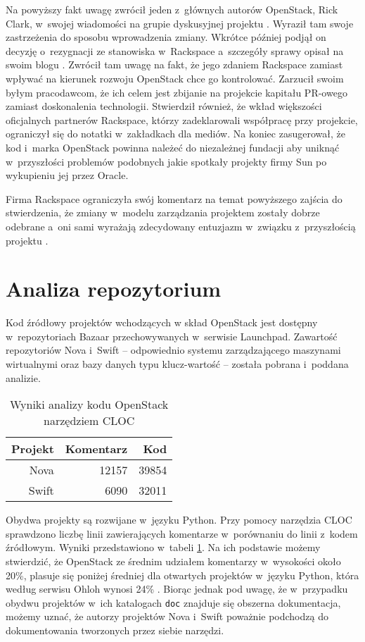 \documentclass[a4paper,12pt]{article}
\begin{document}
	Na powyższy fakt uwagę zwrócił jeden z~głównych autorów OpenStack, Rick
	Clark, w~swojej wiadomości na grupie dyskusyjnej projektu
	\cite{clark_list_msg}. Wyraził tam swoje zastrzeżenia do sposobu
	wprowadzenia zmiany. Wkrótce później podjął on decyzję o~rezygnacji ze
	stanowiska w~Rackspace a~szczegóły sprawy opisał na swoim blogu
	\cite{why_i_left_rackspace}. Zwrócił tam uwagę na fakt, że jego zdaniem
	Rackspace zamiast wpływać na kierunek rozwoju OpenStack chce go kontrolować.
	Zarzucił swoim byłym pracodawcom, że ich celem jest zbijanie na projekcie
	kapitału PR-owego zamiast doskonalenia technologii. Stwierdził również, że
	wkład większości oficjalnych partnerów Rackspace, którzy zadeklarowali
	współpracę przy projekcie, ograniczył się do notatki w~zakładkach dla
	mediów. Na koniec zasugerował, że kod i~marka OpenStack powinna należeć do
	niezależnej fundacji aby uniknąć w~przyszłości problemów podobnych jakie
	spotkały projekty firmy Sun po wykupieniu jej przez Oracle.

	Firma Rackspace ograniczyła swój komentarz na temat powyższego zajścia do
	stwierdzenia, że zmiany w~modelu zarządzania projektem zostały dobrze
	odebrane a~oni sami wyrażają zdecydowany entuzjazm w~związku z~przyszłością
	projektu \cite{concerns_about_openness}.

	\section{Analiza repozytorium}

	Kod źródłowy projektów wchodzących w skład OpenStack jest dostępny
	w~repozytoriach Bazaar przechowywanych w~serwisie Launchpad. Zawartość
	repozytoriów Nova i~Swift -- odpowiednio systemu zarządzającego maszynami
	wirtualnymi oraz bazy danych typu klucz-wartość -- została pobrana i~poddana
	analizie.

	\begin{table}
		\centering
		\begin{tabular}{|r|r|r|}
			\hline
			\bf Projekt & \bf Komentarz & \phantom{asdf} \bf Kod \\
			\hline
			Nova & 12157 & 39854 \\
			Swift & 6090 & 32011 \\
			\hline
		\end{tabular}
		\caption{Wyniki analizy kodu OpenStack narzędziem CLOC}
		\label{tab:cloc}
	\end{table}

	Obydwa projekty są rozwijane w~języku Python. Przy pomocy narzędzia CLOC
	\cite{cloc} sprawdzono liczbę linii zawierających komentarze w~porównaniu do
	linii z~kodem źródłowym. Wyniki przedstawiono w~tabeli \ref{tab:cloc}.
	Na ich podstawie możemy stwierdzić, że OpenStack ze średnim udziałem
	komentarzy w~wysokości około 20\%, plasuje się poniżej średniej dla
	otwartych projektów w~języku Python, która według serwisu Ohloh wynosi 24\%
	\cite{ohloh_python_stats}. Biorąc jednak pod uwagę, że w~przypadku obydwu
	projektów w~ich katalogach \texttt{doc} znajduje się obszerna dokumentacja,
	możemy uznać, że autorzy projektów Nova i~Swift poważnie podchodzą do
	dokumentowania tworzonych przez siebie narzędzi.
\end{document}
